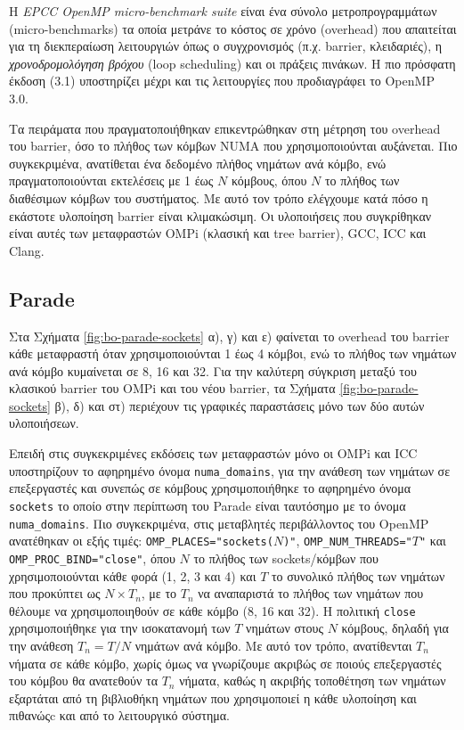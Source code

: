 Η \textit{EPCC OpenMP micro-benchmark suite} \cite{bull1999measuring} είναι ένα σύνολο μετροπρογραμμάτων (micro-benchmarks) τα οποία μετράνε το κόστος σε χρόνο (overhead) που απαιτείται για τη διεκπεραίωση λειτουργιών όπως ο συγχρονισμός (π.χ. barrier, κλειδαριές), η \textit{χρονοδρομολόγηση βρόχου} (loop scheduling) και οι πράξεις πινάκων. Η πιο πρόσφατη έκδοση (3.1) υποστηρίζει μέχρι και τις λειτουργίες που προδιαγράφει το OpenMP 3.0.

Τα πειράματα που πραγματοποιήθηκαν επικεντρώθηκαν στη μέτρηση του overhead του barrier, όσο το πλήθος των κόμβων NUMA που χρησιμοποιούνται αυξάνεται. Πιο συγκεκριμένα, ανατίθεται ένα δεδομένο πλήθος νημάτων ανά κόμβο, ενώ πραγματοποιούνται εκτελέσεις με 1 έως $N$ κόμβους, όπου $N$ το πλήθος των διαθέσιμων κόμβων του συστήματος. Με αυτό τον τρόπο ελέγχουμε κατά πόσο η εκάστοτε υλοποίηση barrier είναι κλιμακώσιμη. Οι υλοποιήσεις που συγκρίθηκαν είναι αυτές των μεταφραστών OMPi (κλασική και tree barrier), GCC, ICC και Clang.


\subsection{Parade}
Στα Σχήματα \ref{fig:bo-parade-sockets} α), γ) και ε) φαίνεται το overhead του barrier κάθε μεταφραστή όταν χρησιμοποιούνται 1 έως 4 κόμβοι, ενώ το πλήθος των νημάτων ανά κόμβο κυμαίνεται σε 8, 16 και 32. Για την καλύτερη σύγκριση μεταξύ του κλασικού barrier του OMPi και του νέου barrier, τα Σχήματα \ref{fig:bo-parade-sockets} β), δ) και στ)    περιέχουν τις γραφικές παραστάσεις μόνο των δύο αυτών υλοποιήσεων.

Επειδή στις συγκεκριμένες εκδόσεις των μεταφραστών μόνο οι OMPi και ICC υποστηρίζουν το αφηρημένο όνομα \texttt{numa\_domains}, για την ανάθεση των νημάτων σε επεξεργαστές και συνεπώς σε κόμβους χρησιμοποιήθηκε το αφηρημένο όνομα \texttt{sockets} το οποίο στην περίπτωση του Parade είναι ταυτόσημο με το όνομα \texttt{numa\_domains}. Πιο συγκεκριμένα, στις μεταβλητές περιβάλλοντος του OpenMP ανατέθηκαν οι εξής τιμές: \texttt{OMP\_PLACES="sockets($N$)"}, \texttt{OMP\_NUM\_THREADS="$T$"} και \texttt{OMP\_PROC\_BIND="close"}, όπου $N$ το πλήθος των sockets/κόμβων που χρησιμοποιούνται κάθε φορά (1, 2, 3 και 4) και $T$ το συνολικό πλήθος των νημάτων που προκύπτει ως $N \times T_n$, με το $T_n$ να αναπαριστά το πλήθος των νημάτων που θέλουμε να χρησιμοποιηθούν σε κάθε κόμβο (8, 16 και 32). Η πολιτική \texttt{close} χρησιμοποιήθηκε για την ισοκατανομή των $T$ νημάτων στους $N$ κόμβους, δηλαδή για την ανάθεση $T_n = T/N$ νημάτων ανά κόμβο. Με αυτό τον τρόπο, ανατίθενται $T_n$ νήματα σε κάθε κόμβο, χωρίς όμως να γνωρίζουμε ακριβώς σε ποιούς επεξεργαστές του κόμβου θα ανατεθούν τα $T_n$ νήματα, καθώς η ακριβής τοποθέτηση των νημάτων εξαρτάται από τη βιβλιοθήκη νημάτων που χρησιμοποιεί η κάθε υλοποίηση και πιθανώςc και από το λειτουργικό σύστημα.

